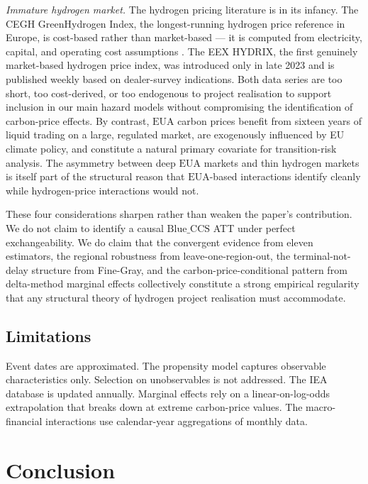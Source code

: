 \documentclass[review,authoryear,11pt]{elsarticle}
\newcommand{\BlueCCS}{\mathrm{Blue\_CCS}}
\newcommand{\EUA}{\mathrm{EUA}}
\begin{document}
\textit{Immature hydrogen market.} The hydrogen pricing literature is in its infancy. The CEGH GreenHydrogen Index, the longest-running hydrogen price reference in Europe, is cost-based rather than market-based --- it is computed from electricity, capital, and operating cost assumptions \citep{IEA2023}. The EEX HYDRIX, the first genuinely market-based hydrogen price index, was introduced only in late 2023 and is published weekly based on dealer-survey indications. Both data series are too short, too cost-derived, or too endogenous to project realisation to support inclusion in our main hazard models without compromising the identification of carbon-price effects. By contrast, $\EUA$ carbon prices benefit from sixteen years of liquid trading on a large, regulated market, are exogenously influenced by EU climate policy, and constitute a natural primary covariate for transition-risk analysis. The asymmetry between deep $\EUA$ markets and thin hydrogen markets is itself part of the structural reason that $\EUA$-based interactions identify cleanly while hydrogen-price interactions would not.

These four considerations sharpen rather than weaken the paper's contribution. We do not claim to identify a causal $\BlueCCS$ ATT under perfect exchangeability. We do claim that the convergent evidence from eleven estimators, the regional robustness from leave-one-region-out, the terminal-not-delay structure from Fine-Gray, and the carbon-price-conditional pattern from delta-method marginal effects collectively constitute a strong empirical regularity that any structural theory of hydrogen project realisation must accommodate.

\subsection{Limitations}

Event dates are approximated. The propensity model captures observable characteristics only. Selection on unobservables is not addressed. The IEA database is updated annually. Marginal effects rely on a linear-on-log-odds extrapolation that breaks down at extreme carbon-price values. The macro-financial interactions use calendar-year aggregations of monthly data.

\section{Conclusion}
\end{document}
